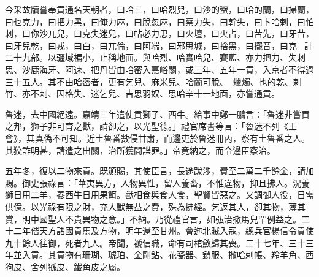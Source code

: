 \begin{pinyinscope}
今采故牘嘗奉貢通名天朝者，曰哈三，曰哈烈兒，曰沙的蠻，曰哈的蘭，曰掃蘭，曰乜克力，曰把力黑，曰俺力麻，曰脫忽麻，曰察力失，曰幹失，曰卜哈剌，曰怕剌，曰你沙兀兒，曰克失迷兒，曰帖必力思，曰火壇，曰火占，曰苦先，曰牙昔，曰牙兒乾，曰戎，曰白，曰兀倫，曰阿端，曰邪思城，曰捨黑，曰擺音，曰克，計二十九部。以疆域褊小，止稱地面。與哈烈、哈實哈兒、賽藍、亦力把力、失剌思、沙鹿海牙、阿速、把丹皆由哈密入嘉峪關，或三年、五年一貢，入京者不得過三十五人。其不由哈密者，更有乞兒、麻米兒、哈蘭可脫、蠟燭、也的乾、剌竹、亦不剌、因格失、迷乞兒、吉思羽奴、思哈辛十一地面，亦嘗通貢。

魯迷，去中國絕遠。嘉靖三年遣使貢獅子、西牛。給事中鄭一鵬言：「魯迷非嘗貢之邦，獅子非可育之獸，請卻之，以光聖德。」禮官席書等言：「魯迷不列《王會》，其真偽不可知。近土魯番數侵甘肅，而邊吏於魯迷冊內，察有土魯番之人。其狡詐明甚，請遣之出關，治所獲間諜罪。」帝竟納之，而令邊臣察治。

五年冬，復以二物來貢。既頒賜，其使臣言，長途跋涉，費至二萬二千餘金，請加賜。御史張祿言：「華夷異方，人物異性，留人養畜，不惟違物，抑且拂人。況養獅日用二羊，養西牛日用果餌。獸相食與食人食，聖賢皆惡之。又調御人役，日需供億。以光祿有限之財，充人獸無益之費，殊為拂經。乞返其人，卻其物，薄其賞，明中國聖人不貴異物之意。」不納。乃從禮官言，如弘治撒馬兒罕例益之。二十二年偕天方諸國貢馬及方物，明年還至甘州。會迤北賊入寇，總兵官楊信令貢使九十餘人往御，死者九人。帝聞，褫信職，命有司棺斂歸其喪。二十七年、三十三年並入貢。其貢物有珊瑚、琥珀、金剛鉆、花瓷器、鎖服、撒哈剌帳、羚羊角、西狗皮、舍列猻皮、鐵角皮之屬。


\end{pinyinscope}